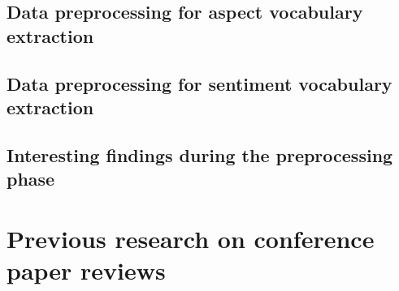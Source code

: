 \subsection{Data preprocessing for aspect vocabulary extraction}
\subsection{Data preprocessing for sentiment vocabulary extraction}
\subsection{Interesting findings during the preprocessing phase}
\section{Previous research on conference paper reviews}
